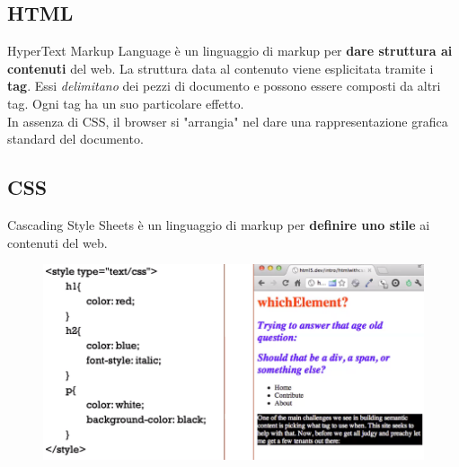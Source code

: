 \documentclass[12pt, a4paper]{article}
\begin{document}
    \subsection{HTML}
    HyperText Markup Language è un linguaggio di markup per \textbf{dare struttura ai contenuti} del web.
    La struttura data al contenuto viene esplicitata tramite i \textbf{tag}. Essi \textit{delimitano}
    dei pezzi di documento e possono essere composti da altri tag. Ogni tag ha un suo particolare effetto.
    \\In assenza di CSS, il browser si "arrangia" nel dare una rappresentazione grafica standard del documento.

    \subsection{CSS}
    Cascading Style Sheets è un linguaggio di markup per \textbf{definire uno stile} ai contenuti del web.
    \begin{figure}[htbp]
        \centering
        \includegraphics[scale=0.5]{css.png}
    \end{figure}
\end{document}
